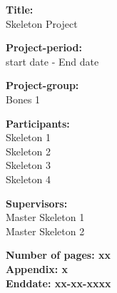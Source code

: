 \begin{minipage}[t]{0.48\textwidth}
\textbf{Title:} \\[5pt]\bigskip\hspace{2ex}
Skeleton Project

\textbf{Project-period:} \\[5pt]\bigskip\hspace{2ex}
start date - End date

\textbf{Project-group:} \\[5pt]\bigskip\hspace{2ex}
Bones 1

\textbf{Participants:} \\[5pt]\hspace*{2ex}
Skeleton 1 \\\hspace*{2ex}
Skeleton 2 \\\hspace*{2ex}
Skeleton 3 \\\hspace*{2ex}
Skeleton 4 \\\bigskip\hspace{2ex}


\textbf{Supervisors:} \\[5pt]\hspace*{2ex}
Master Skeleton 1 \\\hspace*{2ex}
Master Skeleton 2 \\\bigskip\hspace{2ex}

\vspace*{1cm}

\textbf{Number of pages: xx} \\
\textbf{Appendix: x} \\ 
\textbf{Enddate: xx-xx-xxxx}

\end{minipage}
\hfill


